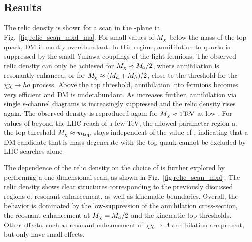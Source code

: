 \subsection{Results}
The relic density is shown for a scan in the \ma-\mDM plane in Fig.~\ref{fig:relic_scan_mxd_ma}.
For small values of $M_{\chi}$ below the mass of the top quark, DM is mostly overabundant. In this regime, annihilation to quarks is suppressed by the small Yukawa couplings of the light fermions. The observed relic density can only be achieved for $M_{\chi}\approx M_{a}/2$, where annihilation is resonantly enhanced, or for $M_{\chi} \approx (M_{a}+M_{h})/2$, close to the threshold for the $\chi\chi\rightarrow h a$ process.
Above the top threshold, annihilation into fermions becomes very efficient and DM is underabundant. As \mDM increases further, annihilation via single s-channel diagrams is increasingly suppressed and the relic density rises again. The observed density is reproduced again for $M_{\chi}\approx1 \mathrm{TeV}$ at low \ma.
For values of \ma beyond the LHC reach of a few TeV, the allowed parameter region at the top threshold $M_{\chi}\approx m_{\mathrm{top}}$ stays independent of the value of \ma, indicating that a DM candidate that is mass degenerate with the top quark cannot be excluded by LHC searches alone.

The dependence of the relic density on the choice of \mDM is further explored by performing a one-dimensional scan, as shown in Fig.~\ref{fig:relic_scan_mxd}. The relic density shows clear structures corresponding to the previously discussed regions of resonant enhancement, as well as kinematic boundaries. Overall, the behavior is dominated by the low-\mDM suppression of the annihilation cross-section, the reosnant enhancement at $M_{\chi} = M_{a}/2$ and the kinematic top thresholds. Other effects, such as resonant enhancement of $\chi\chi\rightarrow A$ annihilation are present, but only have small effects.

